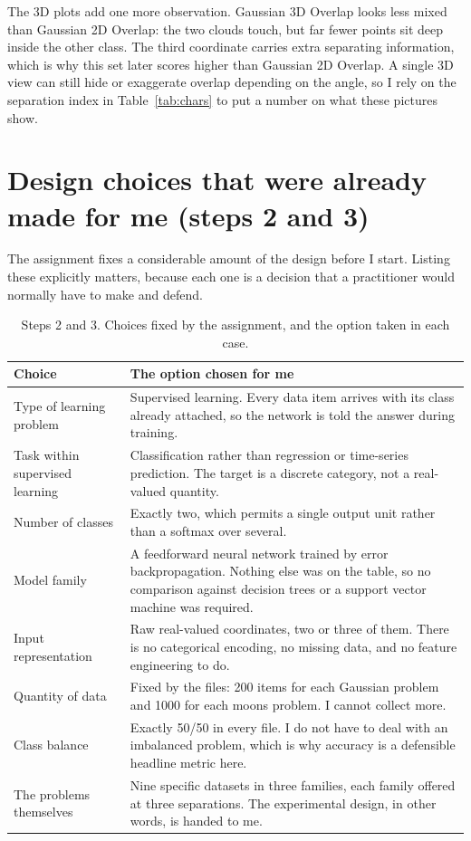 \documentclass[11pt]{article}
\begin{document}
The 3D plots add one more observation. Gaussian 3D Overlap looks less mixed
than Gaussian 2D Overlap: the two clouds touch, but far fewer points sit deep
inside the other class. The third coordinate carries extra separating
information, which is why this set later scores higher than Gaussian 2D Overlap.
A single 3D view can still hide or exaggerate overlap depending on the angle, so
I rely on the separation index in Table~\ref{tab:chars} to put a number on what
these pictures show.

\section{Design choices that were already made for me (steps 2 and 3)}
\label{sec:given}

The assignment fixes a considerable amount of the design before I start. Listing
these explicitly matters, because each one is a decision that a practitioner
would normally have to make and defend.

\begin{table}[H]
\centering
\small
\begin{tabular}{p{5.1cm}p{9.4cm}}
\toprule
\textbf{Choice} & \textbf{The option chosen for me} \\
\midrule
Type of learning problem &
Supervised learning. Every data item arrives with its class already attached,
so the network is told the answer during training. \\
\addlinespace
Task within supervised learning &
Classification rather than regression or time-series prediction. The target is
a discrete category, not a real-valued quantity. \\
\addlinespace
Number of classes &
Exactly two, which permits a single output unit rather than a softmax over
several. \\
\addlinespace
Model family &
A feedforward neural network trained by error backpropagation. Nothing else
was on the table, so no comparison against decision trees or a support vector
machine was required. \\
\addlinespace
Input representation &
Raw real-valued coordinates, two or three of them. There is no categorical
encoding, no missing data, and no feature engineering to do. \\
\addlinespace
Quantity of data &
Fixed by the files: 200 items for each Gaussian problem and 1000 for each
moons problem. I cannot collect more. \\
\addlinespace
Class balance &
Exactly 50/50 in every file. I do not have to deal with an imbalanced problem,
which is why accuracy is a defensible headline metric here. \\
\addlinespace
The problems themselves &
Nine specific datasets in three families, each family offered at three
separations. The experimental design, in other words, is handed to me. \\
\bottomrule
\end{tabular}
\caption{Steps 2 and 3. Choices fixed by the assignment, and the option taken
in each case.}
\end{table}
\end{document}
